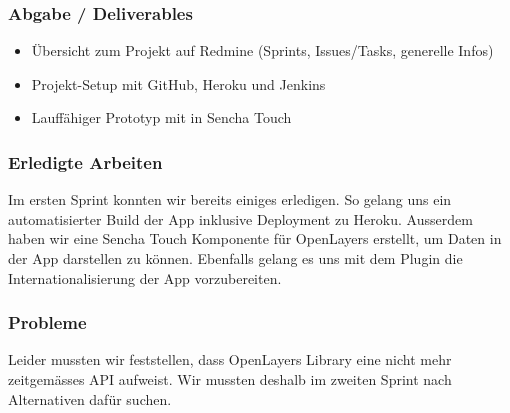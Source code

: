 \subsubsection{Abgabe / Deliverables}

\begin{itemize}
	\item Übersicht zum Projekt auf Redmine (Sprints, Issues/Tasks, generelle Infos)
	\item Projekt-Setup mit GitHub, Heroku und Jenkins
	\item Lauffähiger Prototyp mit  in Sencha Touch
\end{itemize}

\subsubsection{Erledigte Arbeiten}
Im ersten Sprint konnten wir bereits einiges erledigen. So gelang uns ein automatisierter Build der App inklusive Deployment zu Heroku. Ausserdem haben wir eine Sencha Touch Komponente für OpenLayers erstellt, um  Daten in der App darstellen zu können. Ebenfalls gelang es uns mit dem Plugin  die Internationalisierung der App vorzubereiten.

\subsubsection{Probleme}
Leider mussten wir feststellen, dass OpenLayers Library eine nicht mehr zeitgemässes \gls{API} aufweist. Wir mussten deshalb im zweiten Sprint nach Alternativen dafür suchen.